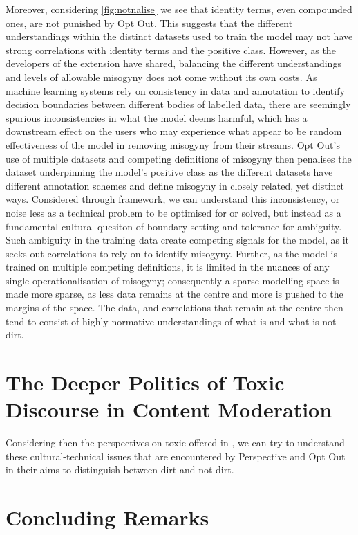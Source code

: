 Moreover, considering \autoref{fig:notnalise} we see that identity terms, even compounded ones, are not punished by Opt Out. This suggests that the different understandings within the distinct datasets used to train the model may not have strong correlations with identity terms and the positive class. However, as the developers of the extension have shared, balancing the different understandings and levels of allowable misogyny does not come without its own costs. As machine learning systems rely on consistency in data and annotation to identify decision boundaries between different bodies of labelled data, there are seemingly spurious inconsistencies in what the model deems harmful, which has a downstream effect on the users who may experience what appear to be random effectiveness of the model in removing misogyny from their streams. Opt Out's use of multiple datasets and competing definitions of misogyny then penalises the dataset underpinning the model's positive class as the different datasets have different annotation schemes and define misogyny in closely related, yet distinct ways. Considered through \citet{Douglas:1966} framework, we can understand this inconsistency, or noise less as a technical problem to be optimised for or solved, but instead as a fundamental cultural quesiton of boundary setting and tolerance for ambiguity. Such ambiguity in the training data create competing signals for the model, as it seeks out correlations to rely on to identify misogyny. Further, as the model is trained on multiple competing definitions, it is limited in the nuances of any single operationalisation of misogyny; consequently a sparse modelling space is made more sparse, as less data remains at the centre and more is pushed to the margins of the space. The data, and correlations that remain at the centre then tend to consist of highly normative understandings of what is and what is not dirt.

\section{The Deeper Politics of Toxic Discourse in Content Moderation}

Considering then the perspectives on toxic offered in \cite{Risam:2015}, we can try to understand these cultural-technical issues that are encountered by Perspective and Opt Out in their aims to distinguish between dirt and not dirt.

\section{Concluding Remarks}
